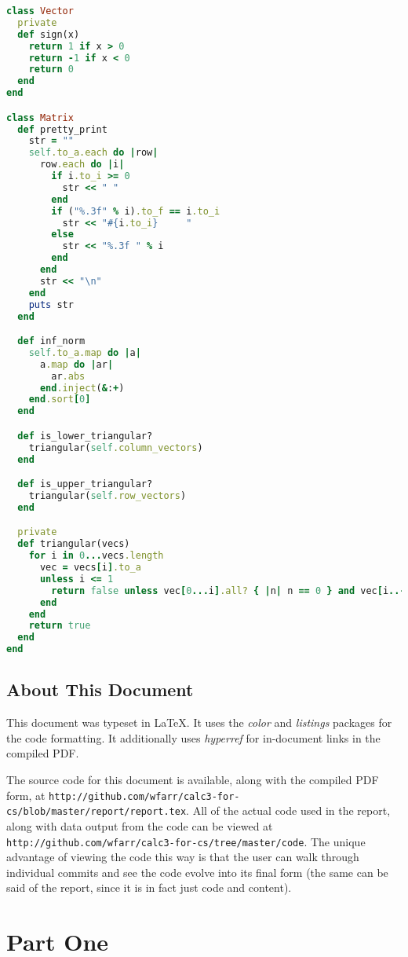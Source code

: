 \documentclass[letterpaper,12pt]{article}
\begin{document}
\lstset{caption=Common Code for All Three Parts}
\begin{lstlisting}[language=ruby]
class Vector
  private
  def sign(x)
    return 1 if x > 0
    return -1 if x < 0
    return 0
  end
end

class Matrix
  def pretty_print
    str = ""
    self.to_a.each do |row|
      row.each do |i|
        if i.to_i >= 0
          str << " "
        end
        if ("%.3f" % i).to_f == i.to_i
          str << "#{i.to_i}     "
        else
          str << "%.3f " % i
        end
      end
      str << "\n"
    end
    puts str
  end

  def inf_norm
    self.to_a.map do |a|
      a.map do |ar|
        ar.abs
      end.inject(&:+)
    end.sort[0]
  end

  def is_lower_triangular?
    triangular(self.column_vectors)
  end

  def is_upper_triangular?
    triangular(self.row_vectors)
  end

  private
  def triangular(vecs)
    for i in 0...vecs.length
      vec = vecs[i].to_a
      unless i <= 1
        return false unless vec[0...i].all? { |n| n == 0 } and vec[i..-1].all? { |n| n != 0 }
      end
    end
    return true
  end
end
\end{lstlisting}

\subsection{About This Document}

This document was typeset in \LaTeX.
It uses the \textit{color} and \textit{listings} packages for the code
formatting.
It additionally uses \textit{hyperref} for in-document links in the compiled PDF.

The source code for this document is available, along with the compiled PDF form, at
\texttt{http://github.com/wfarr/calc3-for-cs/blob/master/report/report.tex}.
All of the actual code used in the report, along with data output from the code
can be viewed at \texttt{http://github.com/wfarr/calc3-for-cs/tree/master/code}.
The unique advantage of viewing the code this way is that the user can walk
through individual commits and see the code evolve into its final form (the
same can be said of the report, since it is in fact just code and content).

\newpage
\section{Part One}
\end{document}
